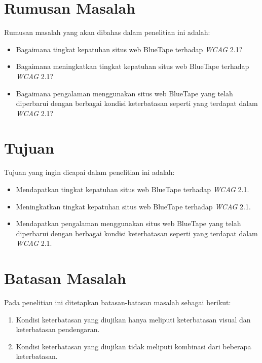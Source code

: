 \section{Rumusan Masalah}
\label{sec:rumusan}
Rumusan masalah yang akan dibahas dalam penelitian ini adalah: 
\begin{itemize}
	\item Bagaimana tingkat kepatuhan situs web BlueTape terhadap \textit{WCAG} 2.1?
	\item Bagaimana meningkatkan tingkat kepatuhan situs web BlueTape terhadap \textit{WCAG} 2.1?  
	\item Bagaimana pengalaman menggunakan situs web BlueTape yang telah diperbarui dengan berbagai kondisi keterbatasan seperti yang terdapat dalam \textit{WCAG} 2.1?
\end{itemize}

\section{Tujuan}
\label{sec:tujuan}
Tujuan yang ingin dicapai dalam penelitian ini adalah:
\begin{itemize}
	\item Mendapatkan tingkat kepatuhan situs web BlueTape terhadap \textit{WCAG} 2.1.
	\item Meningkatkan tingkat kepatuhan situs web BlueTape terhadap \textit{WCAG} 2.1.
	\item Mendapatkan pengalaman menggunakan situs web BlueTape yang telah diperbarui dengan berbagai kondisi keterbatasan seperti yang terdapat dalam \textit{WCAG} 2.1.
\end{itemize}

\section{Batasan Masalah}
\label{sec:batasan}
Pada penelitian ini ditetapkan batasan-batasan masalah sebagai berikut:
\begin{enumerate}
	\item Kondisi keterbatasan yang diujikan hanya meliputi keterbatasan visual dan keterbatasan pendengaran.
	\item Kondisi keterbatasan yang diujikan tidak meliputi kombinasi dari beberapa keterbatasan.
\end{enumerate}


